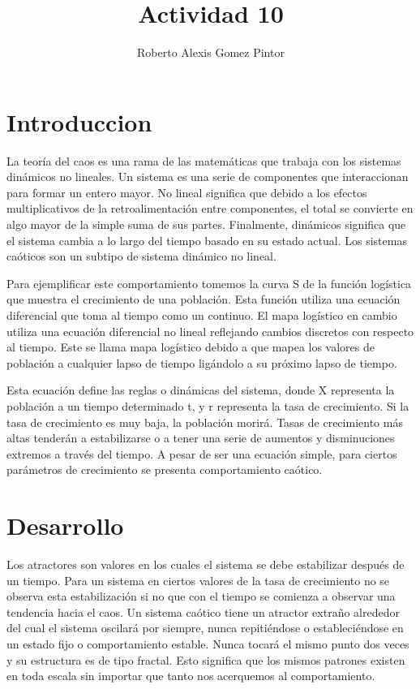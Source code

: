 \documentclass{article} %
\title{Actividad 10}
\author{Roberto Alexis Gomez Pintor}
\begin{document}
\maketitle %

\section*{Introduccion}

La teoría del caos es una rama de las matemáticas que trabaja con los sistemas dinámicos no lineales. Un sistema es una serie de componentes que interaccionan para formar un entero mayor. No lineal significa que debido a los efectos multiplicativos de la retroalimentación entre componentes, el total se convierte en algo mayor de la simple suma de sus partes. Finalmente, dinámicos significa que el sistema cambia a lo largo del tiempo basado en su estado actual. Los sistemas caóticos son un subtipo de sistema dinámico no lineal. 

\vspace{0.5 cm}

Para ejemplificar este comportamiento tomemos la curva S de la función logística que muestra el crecimiento de una población. Esta función utiliza una ecuación diferencial que toma al tiempo como un continuo. El mapa logístico en cambio utiliza una ecuación diferencial no lineal reflejando cambios discretos con respecto al tiempo. Este se llama mapa logístico debido a que mapea los valores de población a cualquier lapso de tiempo ligándolo a su próximo lapso de tiempo.

\vspace{0.5 cm}

Esta ecuación define las reglas o dinámicas del sistema, donde X representa la población a un tiempo determinado t, y r representa la tasa de crecimiento. Si la tasa de crecimiento es muy baja, la población morirá. Tasas de crecimiento más altas tenderán a estabilizarse o a tener una serie de aumentos y disminuciones extremos a través del tiempo. A pesar de ser una ecuación simple, para ciertos parámetros de crecimiento se presenta comportamiento caótico. 

\section*{Desarrollo}

Los atractores son valores en los cuales el sistema se debe estabilizar después de un tiempo. Para un sistema en ciertos valores de la tasa de crecimiento no se observa esta estabilización si no que con el tiempo se comienza a observar una tendencia hacia el caos. Un sistema caótico tiene un atractor extraño alrededor del cual el sistema oscilará por siempre, nunca repitiéndose o estableciéndose en un estado fijo o comportamiento estable. Nunca tocará el mismo punto dos veces y su estructura es de tipo fractal. Esto significa que los mismos patrones existen en toda escala sin importar que tanto nos acerquemos al comportamiento. 
\end{document}
